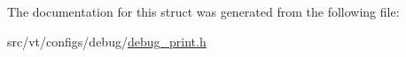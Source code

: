 The documentation for this struct was generated from the following file\+:\begin{DoxyCompactItemize}
\item 
src/vt/configs/debug/\hyperlink{debug__print_8h}{debug\+\_\+print.\+h}\end{DoxyCompactItemize}
